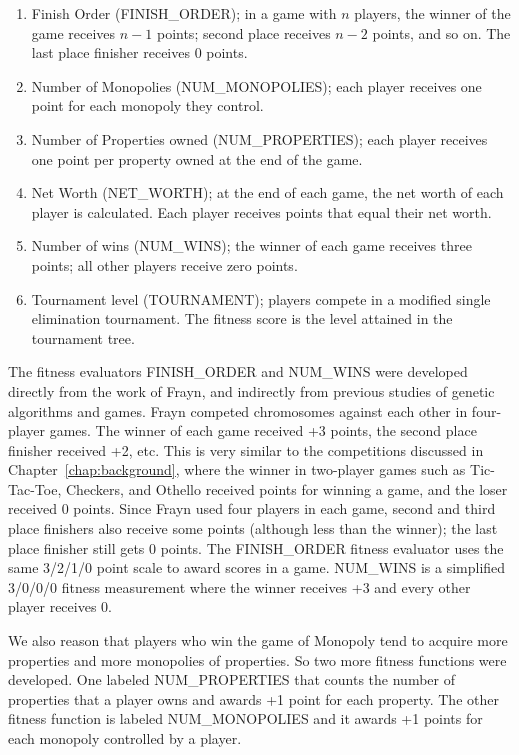 \begin{enumerate}
  \item {Finish Order (FINISH\_ORDER); in a game with \(n\) players, the winner
  of the game receives \(n-1\) points; second place receives \(n-2\) points, and
  so on. The last place finisher receives 0 points.}
  \item {Number of Monopolies (NUM\_MONOPOLIES); each player receives one
  point for each monopoly they control.}
  \item {Number of Properties owned (NUM\_PROPERTIES); each player receives one
  point per property owned at the end of the game.}
  \item {Net Worth (NET\_WORTH); at the end of each game, the net worth of each
  player is calculated. Each player receives points that equal their net
  worth.}
  \item {Number of wins (NUM\_WINS); the winner of each game receives three
  points; all other players receive zero points.}
  \item {Tournament level (TOURNAMENT); players compete in a modified single
  elimination tournament. The fitness score is the level attained in the
  tournament tree.}
\end{enumerate}

The fitness evaluators FINISH\_ORDER and NUM\_WINS were developed directly from
the work of Frayn, and indirectly from previous studies of genetic algorithms
and games. Frayn competed chromosomes against each other in four-player games.
The winner of each game received +3 points, the second place finisher received
+2, etc. This is very similar to the competitions discussed in
Chapter~\ref{chap:background}, where the winner in two-player games such as
Tic-Tac-Toe, Checkers, and Othello received points for winning a game, and the
loser received 0 points. Since Frayn used four players in each game, second and
third place finishers also receive some points (although less than the winner);
the last place finisher still gets 0 points. The FINISH\_ORDER fitness evaluator
uses the same 3/2/1/0 point scale to award scores in a game. NUM\_WINS  is a
simplified 3/0/0/0 fitness measurement where the winner receives +3 and every 
other player receives 0.

We also reason that players who win the game of Monopoly tend to acquire more
properties and more monopolies of properties. So two more fitness functions were
developed. One labeled NUM\_PROPERTIES that counts the number of properties that
a player owns and awards +1 point for each property. The other fitness function
is labeled NUM\_MONOPOLIES and it awards +1 points for each monopoly controlled
by a player.


